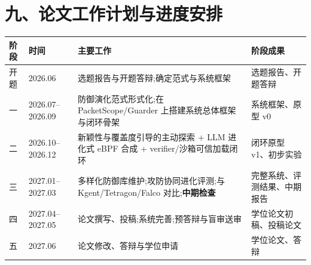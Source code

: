 \section*{九、论文工作计划与进度安排}
\begin{table}[htbp]\centering\small
\begin{tabularx}{\textwidth}{l l X X}
\toprule
\textbf{阶段} & \textbf{时间} & \textbf{主要工作} & \textbf{阶段成果} \\
\midrule
开题 & 2026.06 & 选题报告与开题答辩;确定范式与系统框架 & 选题报告、开题答辩 \\
一 & 2026.07–2026.09 & 防御演化范式形式化;在 PacketScope/Guarder 上搭建系统总体框架与闭环骨架 & 系统框架、原型 v0 \\
二 & 2026.10–2026.12 & 新颖性与覆盖度引导的主动探索 + LLM 进化式 eBPF 合成 + verifier/沙箱可信加载闭环 & 闭环原型 v1、初步实验 \\
三 & 2027.01–2027.03 & 多样化防御库维护;攻防协同进化评测;与 Kgent/Tetragon/Falco 对比;\textbf{中期检查} & 完整系统、评测结果、中期报告 \\
四 & 2027.04–2027.05 & 论文撰写、投稿;系统完善;预答辩与盲审送审 & 学位论文初稿、投稿论文 \\
五 & 2027.06 & 论文修改、答辩与学位申请 & 学位论文、答辩 \\
\bottomrule\end{tabularx}\end{table}